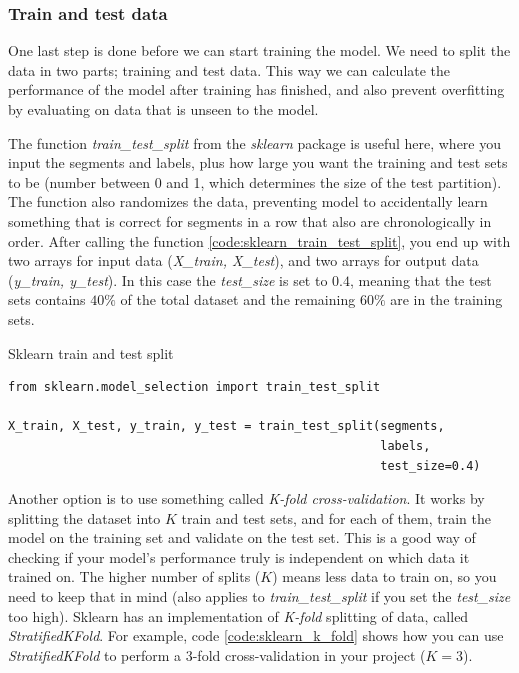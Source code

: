 \subsubsection{Train and test data}
One last step is done before we can start training the model. We need to split the data in two parts; training and test data. This way we can calculate 
the performance of the model after training has finished, and also prevent overfitting by evaluating on data that is unseen to the model. 

The function \textit{train\_test\_split} from the \textit{sklearn} package is useful here, where you input the segments and labels, 
plus how large you want the training and test sets to be (number between 0 and 1, which determines the size of the test partition). 
The function also randomizes the data, preventing model to accidentally learn something that is correct for segments in a row that 
also are chronologically in order. After calling the function \ref{code:sklearn_train_test_split}, you end up with two arrays for input data
(\textit{X\_train, X\_test}), and two arrays for output data (\textit{y\_train, y\_test}). In this case the \textit{test\_size} is set to $0.4$, 
meaning that the test sets contains $40\%$ of the total dataset and the remaining $60\%$ are in the training sets.

\begin{code}
    \caption{Sklearn train and test split}
    \label{code:sklearn_train_test_split}
    
    \begin{verbatim}
from sklearn.model_selection import train_test_split

X_train, X_test, y_train, y_test = train_test_split(segments, 
                                                    labels, 
                                                    test_size=0.4)
    \end{verbatim}
\end{code}

\noindent Another option is to use something called \textit{K-fold cross-validation}. It works by splitting the dataset into $K$ train and test sets, 
and for each of them, train the model on the training set and validate on the test set. This is a good way of checking if your model's performance 
truly is independent on which data it trained on. The higher number of splits ($K$) means less data to train on, so you need to keep that in mind 
(also applies to \textit{train\_test\_split} if you set the \textit{test\_size} too high). Sklearn has an implementation of \textit{K-fold} 
splitting of data, called \textit{StratifiedKFold}. For example, code \ref{code:sklearn_k_fold} shows how you can use \textit{StratifiedKFold}
to perform a 3-fold cross-validation in your project ($K = 3$). 

